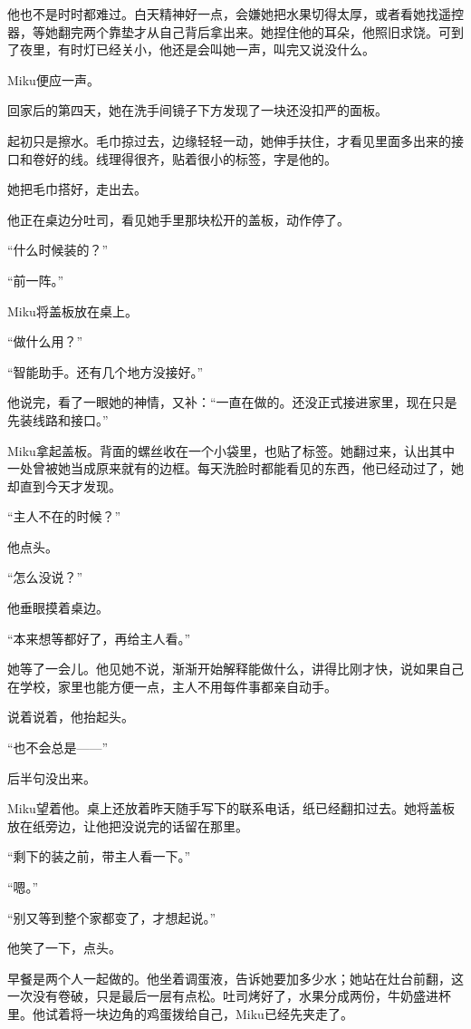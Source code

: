 他也不是时时都难过。白天精神好一点，会嫌她把水果切得太厚，或者看她找遥控器，等她翻完两个靠垫才从自己背后拿出来。她捏住他的耳朵，他照旧求饶。可到了夜里，有时灯已经关小，他还是会叫她一声，叫完又说没什么。

Miku便应一声。

回家后的第四天，她在洗手间镜子下方发现了一块还没扣严的面板。

起初只是擦水。毛巾掠过去，边缘轻轻一动，她伸手扶住，才看见里面多出来的接口和卷好的线。线理得很齐，贴着很小的标签，字是他的。

她把毛巾搭好，走出去。

他正在桌边分吐司，看见她手里那块松开的盖板，动作停了。

“什么时候装的？”

“前一阵。”

Miku将盖板放在桌上。

“做什么用？”

“智能助手。还有几个地方没接好。”

他说完，看了一眼她的神情，又补：“一直在做的。还没正式接进家里，现在只是先装线路和接口。”

Miku拿起盖板。背面的螺丝收在一个小袋里，也贴了标签。她翻过来，认出其中一处曾被她当成原来就有的边框。每天洗脸时都能看见的东西，他已经动过了，她却直到今天才发现。

“主人不在的时候？”

他点头。

“怎么没说？”

他垂眼摸着桌边。

“本来想等都好了，再给主人看。”

她等了一会儿。他见她不说，渐渐开始解释能做什么，讲得比刚才快，说如果自己在学校，家里也能方便一点，主人不用每件事都亲自动手。

说着说着，他抬起头。

“也不会总是——”

后半句没出来。

Miku望着他。桌上还放着昨天随手写下的联系电话，纸已经翻扣过去。她将盖板放在纸旁边，让他把没说完的话留在那里。

“剩下的装之前，带主人看一下。”

“嗯。”

“别又等到整个家都变了，才想起说。”

他笑了一下，点头。

早餐是两个人一起做的。他坐着调蛋液，告诉她要加多少水；她站在灶台前翻，这一次没有卷破，只是最后一层有点松。吐司烤好了，水果分成两份，牛奶盛进杯里。他试着将一块边角的鸡蛋拨给自己，Miku已经先夹走了。

